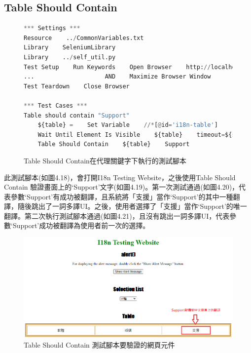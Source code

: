 \subsection{Table Should Contain}
\begin{figure}[H]
\begin{lstlisting}[language={python}]
*** Settings ***
Resource    ../CommonVariables.txt
Library    SeleniumLibrary
Library    ../self_util.py
Test Setup    Run Keywords    Open Browser    http://localhost:3000    Chrome
...                    AND    Maximize Browser Window
Test Teardown    Close Browser

*** Test Cases ***
Table should contain "Support"
    ${table} =    Set Variable    //*[@id='i18n-table']
    Wait Until Element Is Visible    ${table}    timeout=${shortPeriodOfTime}
    Table Should Contain    ${table}    Support
\end{lstlisting}
\caption{Table Should Contain在代理關鍵字下執行的測試腳本}
\end{figure}
此測試腳本(如圖4.18)，會打開I18n Testing Website，之後使用Table Should Contain 驗證畫面上的‘Support’文字(如圖4.19)。第一次測試通過(如圖4.20)，代表參數‘Support’有成功被翻譯，且系統將「支援」當作‘Support’的其中一種翻譯，隨後跳出了一詞多譯UI。之後，使用者選擇了「支援」當作‘Support’的唯一翻譯。第二次執行測試腳本通過(如圖4.21)，且沒有跳出一詞多譯UI，代表參數‘Support’成功被翻譯為使用者前一次的選擇。

\begin{figure}[H]
\includegraphics[width= \textwidth]{../論文截圖/4-1-13 Table should contain要驗證的網頁元件.png}
\caption{Table Should Contain 測試腳本要驗證的網頁元件}
\end{figure}

